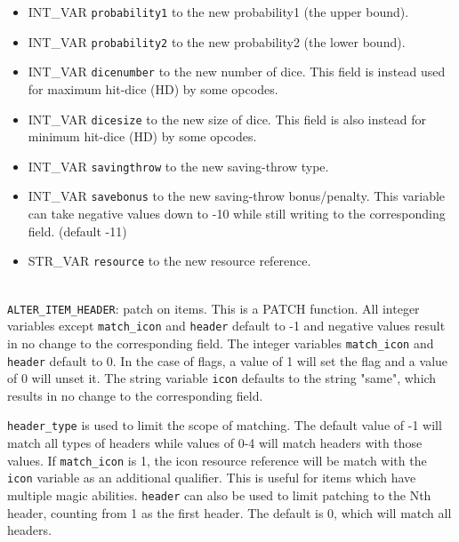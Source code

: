 \documentclass{article}
\begin{document}
\begin{itemize}
\item INT_VAR \verb+probability1+ to the new probability1 (the upper bound).
\item INT_VAR \verb+probability2+ to the new probability2 (the lower bound).
\item INT_VAR \verb+dicenumber+ to the new number of dice. This field is instead used for maximum hit-dice (HD) by some opcodes.
\item INT_VAR \verb+dicesize+ to the new size of dice. This field is also instead for minimum hit-dice (HD) by some opcodes.
\item INT_VAR \verb+savingthrow+ to the new saving-throw type.
\item INT_VAR \verb+savebonus+ to the new saving-throw bonus/penalty. This variable can take negative values down to -10 while still writing to the corresponding field. (default -11)
\item STR_VAR \verb+resource+ to the new resource reference.
\end{itemize}
\\

\verb+ALTER_ITEM_HEADER+: patch  on items. This is a PATCH function. All integer variables except \verb+match_icon+ and \verb+header+ default to -1 and negative values result in no change to the corresponding field. The integer variables \verb+match_icon+ and \verb+header+ default to 0. In the case of flags, a value of 1 will set the flag and a value of 0 will unset it. The string variable \verb+icon+ defaults to the string "same", which results in no change to the corresponding field.

\verb+header_type+ is used to limit the scope of matching. The default value of -1 will match all types of headers while values of 0-4 will match headers with those values. If \verb+match_icon+ is 1, the icon resource reference will be match with the \verb+icon+ variable as an additional qualifier. This is useful for items which have multiple magic abilities. \verb+header+ can also be used to limit patching to the Nth header, counting from 1 as the first header. The default is 0, which will match all headers.
\end{document}
